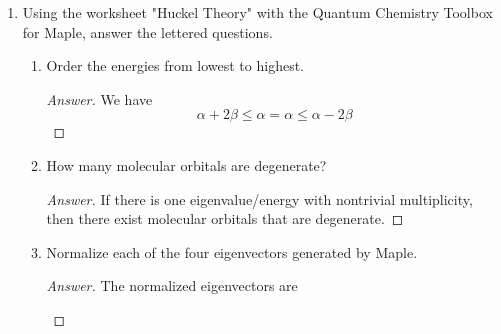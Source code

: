 \documentclass[../psets.tex]{subfiles}
\begin{document}
\begin{enumerate}
\begin{enumerate}
        \begin{proof}[Answer]
            We have
            \begin{align*}
                \begin{split}
                    \psi ={}& \sigma_g1s\alpha(1)\wedge\sigma_g1s\beta(2)\wedge\sigma_u1s\alpha(3)\wedge\sigma_u1s\beta(4)\wedge\sigma_g2s\alpha(5)\wedge\sigma_g2s\beta(6)\wedge\sigma_u2s\alpha(7)\wedge\sigma_u2s\beta(8)\\
                    & \wedge\pi_u2p_x\alpha(9)\wedge\pi_u2p_x\beta(10)\wedge\pi_u2p_y\alpha(11)\wedge\pi_u2p_y\beta(12)\wedge\sigma_g2p_z\alpha(13)\wedge\sigma_g2p_z\beta(14)
                \end{split}
            \end{align*}
            where $\psi=\psi(1,2,3,4,5,6,7,8,9,10,11,12,13,14)$ is a function of the fourteen sets of four (three spatial and one spin) coordinates describing each electron.
        \end{proof}
    \end{enumerate}
    \item Using the worksheet "Huckel Theory" with the Quantum Chemistry Toolbox for Maple, answer the lettered questions.
    \begin{enumerate}
        \item Order the energies from lowest to highest.
        \begin{proof}[Answer]
            We have
            \begin{equation*}
                \boxed{\alpha+2\beta \leq \alpha = \alpha \leq \alpha-2\beta}
            \end{equation*}
        \end{proof}
        \item How many molecular orbitals are degenerate?
        \begin{proof}[Answer]
            If there is one eigenvalue/energy with nontrivial multiplicity, then there exist  molecular orbitals that are degenerate.
        \end{proof}
        \item Normalize each of the four eigenvectors generated by Maple.
        \begin{proof}[Answer]
            The normalized eigenvectors are
            \begin{figure}[h!]
                \centering
                \begin{subfigure}[b]{0.2\linewidth}
                    \centering

\end{subfigure}
\end{figure}
\end{proof}
\end{enumerate}
\end{enumerate}
\end{document}
